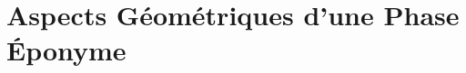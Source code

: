 \part{Aspects Géométriques d'une Phase Éponyme} \label{part:phase_geo} 




	

	
	
	
	

\newpage


 {}
\listoffigures

\vfill


\lstlistoflistings

\vfill




\newpage

{}



